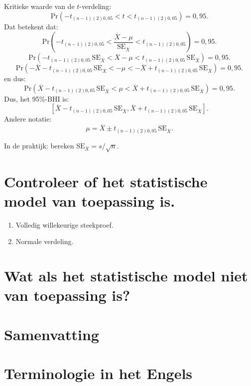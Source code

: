 \documentclass[
  a4paper,
]{scrbook}
\providecommand{\tightlist}{%
  \setlength{\itemsep}{0pt}\setlength{\parskip}{0pt}}\usepackage{longtable,booktabs,array}
\theoremstyle{definition}
\theoremstyle{definition}
\theoremstyle{remark}
\begin{document}
Kritieke waarde van de \(t\)-verdeling: \[
\textrm{Pr}\!\left( -t_{(n-1) (2) 0{,}05} < t < t_{(n-1) (2) 0{,}05} \right) = 0{,}95.
\] Dat betekent dat: \[
\textrm{Pr}\!\left(
    -t_{(n-1) (2) 0{,}05} < \frac{\overline{X} - \mu}{\mathrm{SE}_{\overline{X}}} < t_{(n-1) (2) 0{,}05} \right) = 0{,}95.
\] \[
    \textrm{Pr}\!\left(-t_{(n-1) (2) 0{,}05}\, \mathrm{SE}_{\overline{X}} < \overline{X} - \mu < t_{(n-1) (2) 0{,}05}\,\mathrm{SE}_{\overline{X}}\right) = 0{,}95.
\] \[
    \textrm{Pr}\!\left(-\overline{X} -t_{(n-1) (2) 0{,}05}\, \mathrm{SE}_{\overline{X}} < - \mu < - \overline{X} + t_{(n-1) (2) 0{,}05}\, \mathrm{SE}_{\overline{X}}\right) = 0{,}95.
\] en dus: \[
\textrm{Pr}\!\left(\overline{X} -t_{(n-1) (2) 0{,}05}\, \mathrm{SE}_{\overline{X}} < \mu < \overline{X} + t_{(n-1) (2) 0{,}05}\, \mathrm{SE}_{\overline{X}}\right) = 0{,}95.
\] Dus, het 95\%-BHI is: \[
\left[\overline{X} -t_{(n-1) (2) 0{,}05}\, \mathrm{SE}_{\overline{X}}, \overline{X} + t_{(n-1) (2) 0{,}05}\, \mathrm{SE}_{\overline{X}} \right].
\] Andere notatie: \[
    \mu = \overline{X} \pm t_{(n-1) (2) 0{,}05}\, \mathrm{SE}_{\overline{X}}.
\]

In de praktijk: bereken \(\mathrm{SE}_{\overline{X}} = s / \sqrt{n}\).

\section{Controleer of het statistische model van toepassing
is.}\label{controleer-of-het-statistische-model-van-toepassing-is.}

\begin{enumerate}
\def\labelenumi{\arabic{enumi}.}
\tightlist
\item
  Volledig willekeurige steekproef.
\item
  Normale verdeling.
\end{enumerate}

\section{Wat als het statistische model niet van toepassing
is?}\label{wat-als-het-statistische-model-niet-van-toepassing-is}

\section{Samenvatting}\label{samenvatting-2}

\section{Terminologie in het Engels}\label{terminologie-in-het-engels-2}
\end{document}
